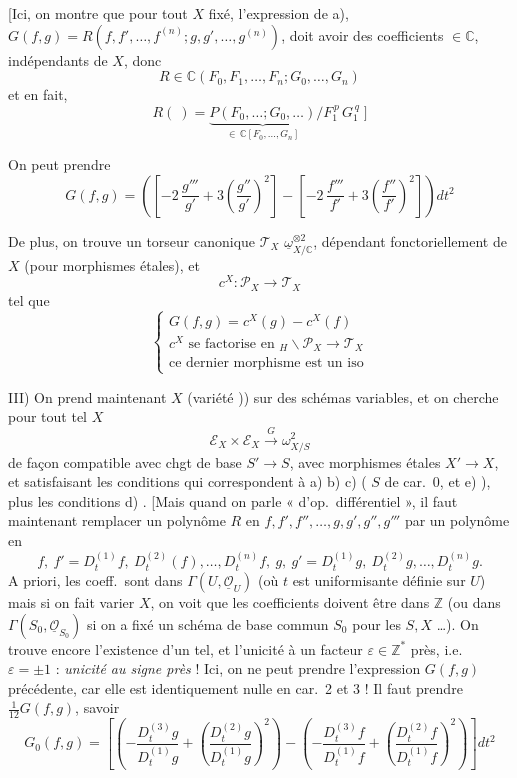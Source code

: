 \documentclass[11pt,a4paper]{article}
\begin{document}
[Ici, on montre que  pour tout $X$ fixé, l'expression de a), $G(f,g) = R(f, f', \dots, f^{(n)}; g, g', \dots, g^{(n)})$, doit avoir des coefficients $\in \mathbb{C}$, indépendants de $X$, donc
\[
R \in \mathbb{C}(F_0, F_1, \dots, F_n; G_0, \dots, G_n)
\]
et en fait,
\[
R(\ ) = \underbrace{P(F_0, \dots; G_0, \dots)}_{\in\, \mathbb{C}[F_0, \dots, G_n]} / F_1^{\,p}\, G_1^{\,q} \;]
\]

On peut prendre
\[
G(f,g) = \left( \left[ -2\, \frac{g'''}{g'} + 3 \left( \frac{g''}{g'} \right)^2 \right] - \left[ -2\, \frac{f'''}{f'} + 3 \left( \frac{f''}{f'} \right)^2 \right] \right) dt^2
\]

De plus, on trouve un torseur canonique $\mathcal{T}_X$ \struck{\ill{}}  $\underline{\omega}_{X/\mathbb{C}}^{\otimes 2}$, dépendant fonctoriellement de $X$ (pour morphismes étales), et \struck{\ill{}}
\[
c^X : \mathcal{P}_X \longrightarrow \mathcal{T}_X
\]
tel que
\[
\begin{cases}
G(f,g) = c^X(g) - c^X(f) \\
c^X \text{ se factorise en } {}_H\backslash \mathcal{P}_X \to \mathcal{T}_X \\
\text{ce dernier morphisme est un iso}
\end{cases}
\]

III) On prend maintenant $X$  (variété   \ill{} )) sur des schémas variables, et on cherche pour tout tel $X$
\[
\mathcal{E}_X \times \mathcal{E}_X \xrightarrow{\ G\ } \omega^{2}_{X/S}
\]
de façon compatible avec chgt de base $S' \to S$, avec morphismes étales $X' \to X$, et satisfaisant les conditions qui correspondent à a) b) c) ( $S$  de car.\ 0, et e) \ill{}), plus les conditions d) \struck{\ill{} \ill{}} .
[Mais quand on parle « d'op.\ différentiel », il faut maintenant remplacer un polynôme $R$ en $f, f', f'', \dots, g, g', g'', g'''$ par un polynôme en
\[
f,\ f' = D_t^{(1)} f,\ D_t^{(2)}(f), \dots, D_t^{(n)} f,\ g,\ g' = D_t^{(1)} g,\ D_t^{(2)} g, \dots, D_t^{(n)} g.
\]
 A priori, les coeff.\ sont dans $\Gamma(U, \underline{\mathcal{O}}_U)$ (où $t$ est uniformisante définie sur $U$) mais si on \struck{\ill{}}  fait varier $X$, on voit que les coefficients doivent être dans $\mathbb{Z}$ (ou dans $\Gamma(S_0, \underline{\mathcal{O}}_{S_0})$ si on a fixé un schéma de base commun $S_0$ pour les $S, X$ …). On trouve encore l'existence d'un tel, et l'unicité à un facteur $\varepsilon \in \mathbb{Z}^*$ près, i.e.\ $\varepsilon = \pm 1$ : \emph{unicité au signe près} ! Ici, on ne peut prendre l'expression $G(f,g)$ précédente, car elle est identiquement nulle en car.\ 2 et 3 ! Il faut prendre $\frac{1}{12} G(f,g)$, savoir
\[
G_0(f,g) = \left[ \left( -\frac{D_t^{(3)} g}{D_t^{(1)} g} + \left( \frac{D_t^{(2)} g}{D_t^{(1)} g} \right)^2 \right) - \left( -\frac{D_t^{(3)} f}{D_t^{(1)} f} + \left( \frac{D_t^{(2)} f}{D_t^{(1)} f} \right)^2 \right) \right] dt^2
\]
\end{document}
